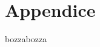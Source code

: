 \documentclass[twoside,11pt,fleqn]{memoir}%
\def\versione{bozza}%
\def\bozza{bozza}
\begin{document}


\cleartorecto




{\let\clearpage\relax\let\cleardoublepage\relax
\backmatter
}

\appendix
\part{Appendice}

\printbibliography
\ifx\versione\bozza
\erratac
\fi
\end{document}
